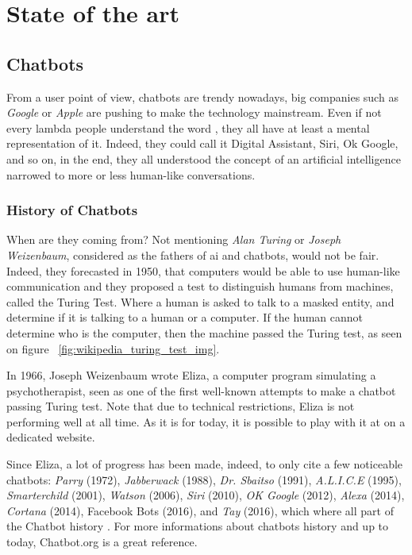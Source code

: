 \chapter{State of the art}
\label{chap:state-of-the-art}

\section{Chatbots}
From a user point of view, chatbots are trendy nowadays, big companies such as \textit{Google} or \textit{Apple} are pushing to make the technology mainstream. Even if not every lambda people understand the word , they all have at least a mental representation of it. Indeed, they could call it Digital Assistant, Siri, Ok Google, and so on, in the end, they all understood the concept of an artificial intelligence narrowed to more or less human-like conversations.

\subsection{History of Chatbots}
When are they coming from? Not mentioning \textit{Alan Turing} or \textit{Joseph Weizenbaum}, considered as the fathers of \gls{ai} and chatbots, would not be fair. Indeed, they forecasted in 1950, that computers would be able to use human-like communication and they proposed a test to distinguish humans from machines, called the Turing Test\cite{paper:turing}. Where a human is asked to talk to a masked entity, and determine if it is talking to a human or a computer. If the human cannot determine who is the computer, then the machine passed the Turing test, as seen on figure ~\ref{fig:wikipedia_turing_test_img}. 

In 1966, Joseph Weizenbaum wrote Eliza, a computer program simulating a psychotherapist, seen as one of the first well-known attempts to make a chatbot passing Turing test. Note that due to technical restrictions, Eliza is not performing well at all time. As it is for today, it is possible to play with it at on a dedicated website. \cite{chatbot:eliza}

Since Eliza, a lot of progress has been made, indeed, to only cite a few noticeable chatbots: \textit{Parry}\cite{chatbot:parry} (1972), \textit{Jabberwack}\cite{chatbot:jabberwack} (1988), \textit{Dr. Sbaitso}\cite{chatbot:dr-sbaitso} (1991), \textit{A.L.I.C.E}\cite{chatbot:alice} (1995), \textit{Smarterchild}\cite{chatbot:smarterchild} (2001), \textit{Watson}\cite{chatbot:watson} (2006), \textit{Siri}\cite{chatbot:siri} (2010), \textit{OK Google}\cite{chatbot:google} (2012), \textit{Alexa}\cite{chatbot:alexa} (2014), \textit{Cortana}\cite{chatbot:cortana} (2014), Facebook Bots\cite{chatbot:facebook} (2016), and \textit{Tay}\cite{chatbot:tay} (2016), which where all part of the Chatbot history \cite{chatbot:futurism_history_infography}. For more informations about chatbots history and up to today, Chatbot.org\cite{chatbot:chatbots-org} is a great reference.

